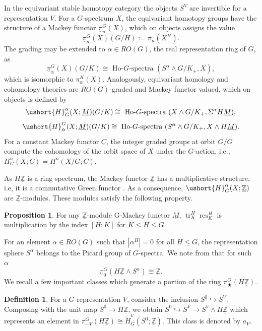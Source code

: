 \documentclass[a4paper,leqno,11pt]{amsart}
\theoremstyle{plain}
\theoremstyle{definition}
\newtheorem{prop}[theorem]{Proposition}
\newtheorem{defn}[theorem]{Definition}
\theoremstyle{remark}
\theoremstyle{definition}
\newcommand{\upi}{\underline{\pi}}
\newcommand\tr{\operatorname{tr}}
\newcommand{\ra}{\rightarrow}
\newenvironment{myeq}[1][]
{\stepcounter{theorem}\begin{equation}\tag{\thetheorem}{#1}}
	{\end{equation}}
\newcommand{\res}{\mathit{res}}
\newcommand{\uM}{\underline{M}}
\newcommand{\uH}{\ushort{H}}
\newcommand{\uZ}{\underline{\mathbb{Z}}}
\def\ra{\rightarrow}
\numberwithin{equation}{section}
\newcommand{\smas}{\wedge}
\def\tH{\tilde{H}}
\renewcommand{\res}{\operatorname{res}}
\begin{document}
	In the equivariant stable homotopy category the objects $ S^{V} $ are invertible for a representation  $ V$. For a $G$-spectrum $X$, the equivariant homotopy groups have the structure of a Mackey functor $\upi^G_n(X)$, which on objects assigns the value
	\[ \upi^G_n(X)(G/H):= \pi_n(X^H).
	\]
	The grading may be extended to  $ \alpha\in  RO(G)$, the real representation ring of $ G $,    as
	\[
	\upi_\alpha^G(X)(G/K) \cong \mbox{ Ho-}G\mbox{-spectra } (S^\alpha \smas G/K_+ , X ),
	\]
	which is  isomorphic to $\pi_\alpha^{K}(X)$. Analogously, equivariant homology and cohomology theories are $RO(G)$-graded and Mackey functor valued, which on objects is defined by 
	\[
	\uH^\alpha_G(X;\uM)(G/K) \cong \mbox{ Ho-}G\mbox{-spectra } (X\smas G/K_+ , \Sigma^\alpha H\uM),
	\]
	\[
	\uH_\alpha^G(X;\uM)(G/K) \cong \mbox{ Ho-}G\mbox{-spectra } (S^\alpha \smas G/K_+ , X \smas H\uM).
	\]
	  For a constant  Mackey functor $ \underline{C} $,   the integer graded groups at orbit  $G/G$ compute the cohomology of  the orbit space of $X$ under the $G$-action, i.e., $H^{n}_{G}(X;\underline{C}) = H^{n}(X/G;C)$.
	

As $ H\uZ $ is a ring spectrum, the Mackey functor $ \uZ $ has a multiplicative structure, i.e, it is a commutative Green functor \cite[chapter XIII.5]{May-EquivBook}. As a consequence, $ \uH^\alpha_G(X;\uZ) $ are $ \uZ $-modules. These modules satisfy the following property.
\begin{prop}\cite[Theorem 4.3]{Yos83}\label{trres}
	For any $ \uZ $-module G-Mackey functor $ \uM $, $ \tr^H_K\res^H_K $ is multiplication by the  index $ [H:K] $ for $ K\le H\le G $.
\end{prop}
For an element $ \alpha\in RO(G) $ such that $ |\alpha^H| =0$ for all $ H\le G $, the representation sphere $ S^\alpha $ belongs to the Picard group of $ G $-spectra.   We note from \cite[Theorem B]{Ang21} that for such $\alpha$
\begin{myeq}\label{eq un6}
	\upi_0^G(H\uZ\smas S^\alpha)\cong  \uZ.
\end{myeq}
We recall a few important classes which generate a portion of the  ring $ \pi_\bigstar^G(H\uZ) $.
	\begin{defn}\cite[\S3]{HHR}
		For a $G$-representation $V$, consider the inclusion $S^0\hookrightarrow S^V$.  Composing with the unit map $S^0 \rightarrow H\uZ$, we obtain $S^0 \hookrightarrow S^V\ra S^V\smas H\uZ$ which represents an element in $\pi^{G}_{-V}(H\uZ)\cong \tH^{V}_{G}(S^0;\uZ)$. This class is denoted by $a_V$.
	\end{defn}
	
\end{document}
